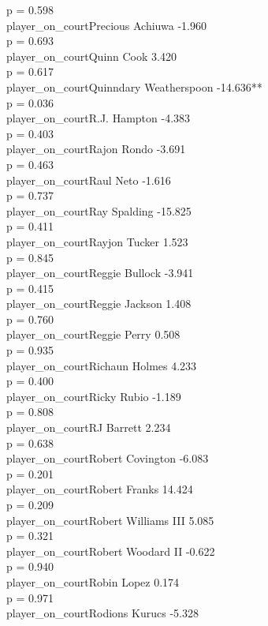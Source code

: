 \documentclass[
  landscape]{article}
\begin{document}
p = 0.598\\
player\_on\_courtPrecious Achiuwa -1.960\\
p = 0.693\\
player\_on\_courtQuinn Cook 3.420\\
p = 0.617\\
player\_on\_courtQuinndary Weatherspoon -14.636**\\
p = 0.036\\
player\_on\_courtR.J. Hampton -4.383\\
p = 0.403\\
player\_on\_courtRajon Rondo -3.691\\
p = 0.463\\
player\_on\_courtRaul Neto -1.616\\
p = 0.737\\
player\_on\_courtRay Spalding -15.825\\
p = 0.411\\
player\_on\_courtRayjon Tucker 1.523\\
p = 0.845\\
player\_on\_courtReggie Bullock -3.941\\
p = 0.415\\
player\_on\_courtReggie Jackson 1.408\\
p = 0.760\\
player\_on\_courtReggie Perry 0.508\\
p = 0.935\\
player\_on\_courtRichaun Holmes 4.233\\
p = 0.400\\
player\_on\_courtRicky Rubio -1.189\\
p = 0.808\\
player\_on\_courtRJ Barrett 2.234\\
p = 0.638\\
player\_on\_courtRobert Covington -6.083\\
p = 0.201\\
player\_on\_courtRobert Franks 14.424\\
p = 0.209\\
player\_on\_courtRobert Williams III 5.085\\
p = 0.321\\
player\_on\_courtRobert Woodard II -0.622\\
p = 0.940\\
player\_on\_courtRobin Lopez 0.174\\
p = 0.971\\
player\_on\_courtRodions Kurucs -5.328\\
\end{document}
